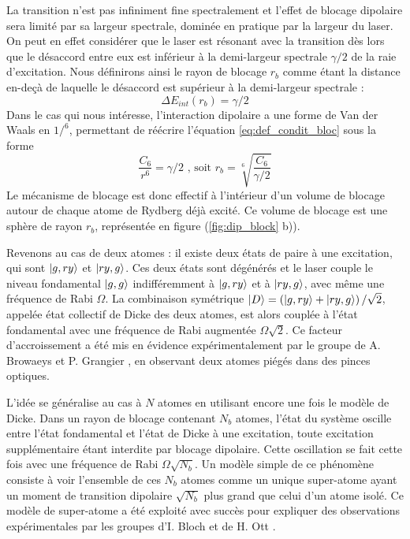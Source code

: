 La transition n'est pas infiniment fine spectralement et l'effet de blocage dipolaire sera limité par sa largeur spectrale, dominée en pratique par la largeur du laser.
On peut en effet considérer que le laser est résonant avec la transition dès lors que le désaccord entre eux est inférieur à la demi-largeur spectrale $\gamma/2$ de la raie d'excitation.
Nous définirons ainsi le \og rayon de blocage \fg{} $r_b$ comme étant la distance en-deçà de laquelle le désaccord est supérieur à la demi-largeur spectrale :
\begin{equation}
\label{eq:def_condit_bloc}
\Delta E_{int}(r_b) = \gamma /2 
\end{equation}
%
Dans le cas qui nous intéresse, l'interaction dipolaire a une forme de Van der Waals en $1/^6$, permettant de réécrire l'équation \eqref{eq:def_condit_bloc} sous la forme
\begin{equation}
\label{eq:def_rayon_bloc}
\frac{C_6}{r^6} = \gamma /2 \text{ , soit } r_b = \sqrt[6]{\frac{C_6}{\gamma /2}}
\end{equation}
%
Le mécanisme de blocage est donc effectif à l'intérieur d'un \og volume de blocage\fg{} autour de chaque atome de Rydberg déjà excité.
Ce volume de blocage est une sphère de rayon $r_b$, représentée en figure (\ref{fig:dip_block} b)).

Revenons au cas de deux atomes :
il existe deux états de paire à une excitation, qui sont $\ket{g,ry}$ et $\ket{ry,g}$.
Ces deux états sont dégénérés et le laser couple le niveau fondamental $\ket{g,g}$ indifféremment à $\ket{g,ry}$ et à $\ket{ry,g}$, avec même une fréquence de Rabi $\Omega$.
La combinaison symétrique $\ket{D} = \left( \ket{g,ry} + \ket{ry,g} \right) / \sqrt{2}$, appelée état collectif de Dicke des deux atomes, est alors couplée à l'état fondamental avec une fréquence de Rabi augmentée $\Omega\sqrt{2}$.
Ce facteur d'accroissement a été mis en évidence expérimentalement par le groupe de A. Browaeys et P. Grangier \cite{MX_BROWAEYS_COLLECRABIBLOCK}, en observant deux atomes piégés dans des pinces optiques.

L'idée se généralise au cas à $N$ atomes en utilisant encore une fois le modèle de Dicke.
Dans un rayon de blocage contenant $N_b$ atomes, l'état du système oscille entre l'état fondamental et l'état de Dicke à une excitation, toute excitation supplémentaire étant interdite par blocage dipolaire.
Cette oscillation se fait cette fois avec une fréquence de Rabi $\Omega\sqrt{N_b}$.
Un modèle simple de ce phénomène consiste à voir l'ensemble de ces $N_b$ atomes comme un unique \og super-atome \fg{} ayant un moment de transition dipolaire $\sqrt{N_b}$ plus grand  que celui d'un atome isolé.
Ce modèle de super-atome a été exploité avec succès pour expliquer des observations expérimentales par les groupes d'I. Bloch \cite{MX_BLOCH_SUPERATOM} et de H. Ott \cite{MX_OTT_SUPERATOM}.


